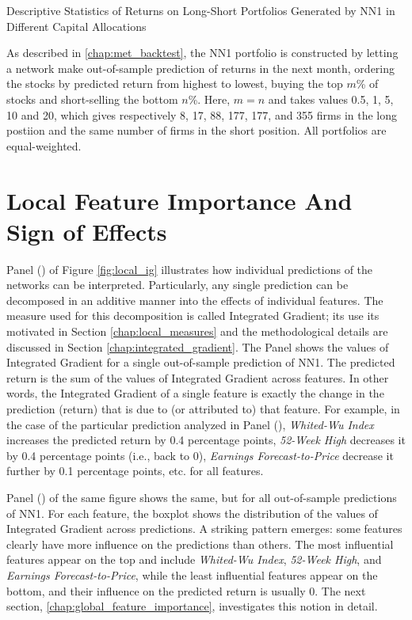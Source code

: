 		\begin{table}
			\centering
			
			\caption{Descriptive Statistics of Returns on Long-Short Portfolios Generated by NN1 in Different Capital Allocations}
			\label{tab:backtest_descriptives_ls}
			\medskip 
			\small 
			As described in \ref{chap:met_backtest}, the NN1 portfolio is constructed by letting a network make out-of-sample prediction of returns in the next month, ordering the stocks by predicted return from highest to lowest, buying the top $m$\% of stocks and short-selling the bottom $n$\%. Here, $m=n$ and takes values 0.5, 1, 5, 10 and 20, which gives respectively 8, 17, 88, 177, 177, and 355 firms in the long postiion and the same number of firms in the short position. All portfolios are equal-weighted. 
		\end{table}

\section {Local Feature Importance And Sign of Effects}
	\label{chap:local_feature_importance}

	Panel () of Figure \ref{fig:local_ig} illustrates how individual predictions of the networks can be interpreted. Particularly, any single prediction can be decomposed in an additive manner into the effects of individual features. The measure used for this decomposition is called Integrated Gradient; its use its motivated in Section \ref{chap:local_measures} and the methodological details are discussed in Section \ref{chap:integrated_gradient}. The Panel shows the values of Integrated Gradient for a single out-of-sample prediction of NN1. The predicted return is the sum of the values of Integrated Gradient across features. In other words, the Integrated Gradient of a single feature is exactly the change in the prediction (return) that is due to (or attributed to) that feature. For example, in the case of the particular prediction analyzed in Panel (),\textit{ Whited-Wu Index} increases the predicted return by 0.4 percentage points, \textit{52-Week High} decreases it by 0.4 percentage points (i.e., back to 0), \textit{Earnings Forecast-to-Price} decrease it further by 0.1 percentage points, etc. for all features. 
	
	Panel () of the same figure shows the same, but for all out-of-sample predictions of NN1. For each feature, the boxplot shows the distribution of the values of Integrated Gradient across predictions. 
	A striking pattern emerges: some features clearly have more influence on the predictions than others. The most influential features appear on the top and include \textit{Whited-Wu Index}, \textit{52-Week High}, and \textit{Earnings Forecast-to-Price}, while the least influential features appear on the bottom, and their influence on the predicted return is usually 0. The next section, \ref{chap:global_feature_importance}, investigates this notion in detail. 
	
